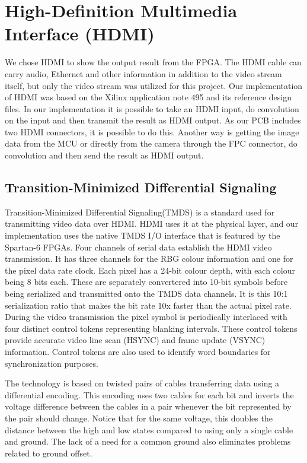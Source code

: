 \section{High-Definition Multimedia Interface (HDMI)}
We chose HDMI to show the output result from the FPGA.
The HDMI cable can carry audio, Ethernet and other information in addition to the video stream itself, but only the video stream was utilized for this project.
Our implementation of HDMI was based on the Xilinx application note 495 \cite{xapp495} and its reference design files.
In our implementation it is possible to take an HDMI input, do convolution on the input and then transmit the result as HDMI output.
As our PCB includes two HDMI connectors, it is possible to do this.
Another way is getting the image data from the MCU or directly from the camera through the FPC connector, do convolution and then send the result as HDMI output.

\subsection{Transition-Minimized Differential Signaling}
Transition-Minimized Differential Signaling(TMDS) is a standard used for transmitting video data over HDMI.
HDMI uses it at the physical layer, and our implementation uses the native TMDS I/O interface that is featured by the Spartan-6 FPGAs.
Four channels of serial data establish the HDMI video transmission.
It has three channels for the RBG colour information and one for the pixel data rate clock.
Each pixel has a 24-bit colour depth, with each colour being 8 bits each.
These are separately convertered into 10-bit symbols before being serialized and transmitted onto the TMDS data channels.
It is this 10:1 serialization ratio that makes the bit rate 10x faster than the actual pixel rate.
During the video transmission the pixel symbol is periodically interlaced with four distinct control tokens representing blanking intervals.
These control tokens provide accurate video line scan (HSYNC) and frame update (VSYNC) information.
Control tokens are also used to identify word boundaries for synchronization purposes.

The technology is based on twisted pairs of cables transferring data using a differential encoding.
This encoding uses two cables for each bit and inverts the voltage difference between the cables in a pair whenever the bit represented by the pair should change.
Notice that for the same voltage, this doubles the distance between the high and low states compared to using only a single cable and ground.
The lack of a need for a common ground also eliminates problems related to ground offset.


